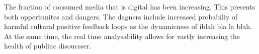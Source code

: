 The fraction of consumed media that is digital has been increasing. This presents both oppertunites and dangers. The dagners include increased probabiliy of harmful cultural positive feedback loops as the dynamicness of iblah bla la blah. At the same time, the real time analysability allows for vastly increasing the health of publiuc disoucsser.
